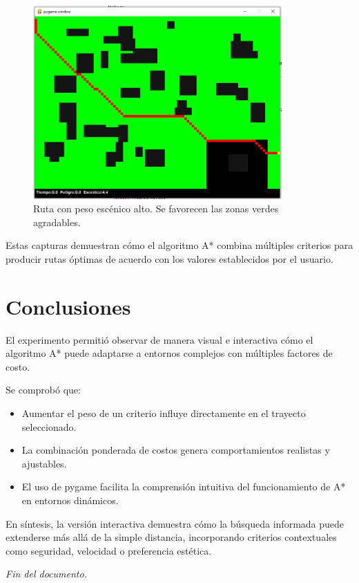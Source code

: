\documentclass[12pt,a4paper]{article}
\begin{document}
\begin{figure}[H]
    \centering
    \includegraphics[width=0.85\textwidth]{ruta_escenico_alto.png}
    \caption{Ruta con peso escénico alto. Se favorecen las zonas verdes agradables.}
\end{figure}

Estas capturas demuestran cómo el algoritmo A* combina múltiples criterios para producir rutas óptimas de acuerdo con los valores establecidos por el usuario.

\section{Conclusiones}

El experimento permitió observar de manera visual e interactiva cómo el algoritmo A* puede adaptarse a entornos complejos con múltiples factores de costo.

Se comprobó que:
\begin{itemize}
    \item Aumentar el peso de un criterio influye directamente en el trayecto seleccionado.
    \item La combinación ponderada de costos genera comportamientos realistas y ajustables.
    \item El uso de pygame facilita la comprensión intuitiva del funcionamiento de A* en entornos dinámicos.
\end{itemize}

En síntesis, la versión interactiva demuestra cómo la búsqueda informada puede extenderse más allá de la simple distancia, incorporando criterios contextuales como seguridad, velocidad o preferencia estética.

\vfill
\begin{center}
\textit{Fin del documento.}
\end{center}
\end{document}
